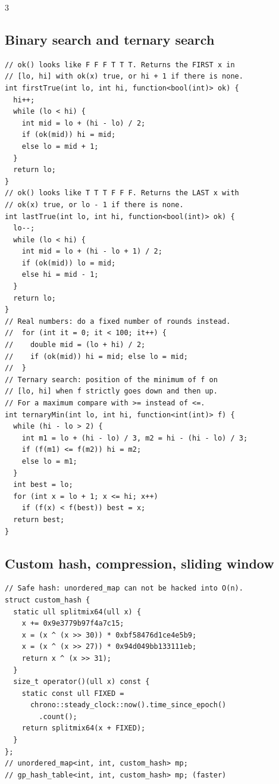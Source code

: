 \documentclass[8pt, a4paper]{article}
\begin{document}
\begin{multicols*}{3}
\subsection{Binary search and ternary search}
\begin{lstlisting}
// ok() looks like F F F T T T. Returns the FIRST x in
// [lo, hi] with ok(x) true, or hi + 1 if there is none.
int firstTrue(int lo, int hi, function<bool(int)> ok) {
  hi++;
  while (lo < hi) {
    int mid = lo + (hi - lo) / 2;
    if (ok(mid)) hi = mid;
    else lo = mid + 1;
  }
  return lo;
}
// ok() looks like T T T F F F. Returns the LAST x with
// ok(x) true, or lo - 1 if there is none.
int lastTrue(int lo, int hi, function<bool(int)> ok) {
  lo--;
  while (lo < hi) {
    int mid = lo + (hi - lo + 1) / 2;
    if (ok(mid)) lo = mid;
    else hi = mid - 1;
  }
  return lo;
}
// Real numbers: do a fixed number of rounds instead.
//  for (int it = 0; it < 100; it++) {
//    double mid = (lo + hi) / 2;
//    if (ok(mid)) hi = mid; else lo = mid;
//  }
// Ternary search: position of the minimum of f on
// [lo, hi] when f strictly goes down and then up.
// For a maximum compare with >= instead of <=.
int ternaryMin(int lo, int hi, function<int(int)> f) {
  while (hi - lo > 2) {
    int m1 = lo + (hi - lo) / 3, m2 = hi - (hi - lo) / 3;
    if (f(m1) <= f(m2)) hi = m2;
    else lo = m1;
  }
  int best = lo;
  for (int x = lo + 1; x <= hi; x++)
    if (f(x) < f(best)) best = x;
  return best;
}
\end{lstlisting}
\subsection{Custom hash, compression, sliding window}
\begin{lstlisting}
// Safe hash: unordered_map can not be hacked into O(n).
struct custom_hash {
  static ull splitmix64(ull x) {
    x += 0x9e3779b97f4a7c15;
    x = (x ^ (x >> 30)) * 0xbf58476d1ce4e5b9;
    x = (x ^ (x >> 27)) * 0x94d049bb133111eb;
    return x ^ (x >> 31);
  }
  size_t operator()(ull x) const {
    static const ull FIXED =
      chrono::steady_clock::now().time_since_epoch()
        .count();
    return splitmix64(x + FIXED);
  }
};
// unordered_map<int, int, custom_hash> mp;
// gp_hash_table<int, int, custom_hash> mp; (faster)


\end{lstlisting}
\end{multicols*}
\end{document}
